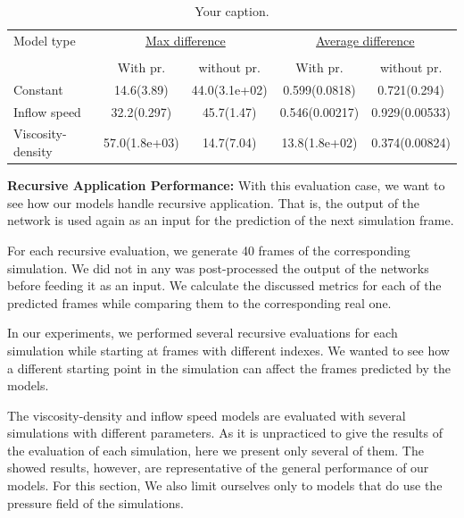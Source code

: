 \documentclass{llncs}
\begin{document}
\begin{table}
  \begin{center}
    \begin{tabular}{lcc|cc}
      \hline
      \hline
      Model type & \multicolumn{2}{c|}{\underline{Max difference}}  &  \multicolumn{2}{c}{\underline{Average difference}}\\
      \multicolumn{3}{c|}{}&&\\
                 & With pr. & without pr.  &  With pr.& without pr.\\
      \hline
      Constant          &  14.6(3.89)&44.0(3.1e+02)&0.599(0.0818)&0.721(0.294)  \\

      Inflow speed      &  32.2(0.297)&45.7(1.47)&0.546(0.00217)&0.929(0.00533) \\

      Viscosity-density &  57.0(1.8e+03)&14.7(7.04)&13.8(1.8e+02)&0.374(0.00824) \\
    \end{tabular}
  \end{center}
  \caption{\label{tab:table-name} Your caption.}
\end{table}

\noindent\textbf{Recursive Application Performance:}
With this evaluation case, we want to see how our models handle recursive application. That is, the output of the network is used again as an input for the prediction of the next simulation frame.

For each recursive evaluation, we generate 40 frames of the corresponding simulation. We did not in any was post-processed the output of the networks before feeding it as an input. We calculate the discussed metrics for each of the predicted frames while comparing them to the corresponding real one.

In our experiments, we performed several recursive evaluations for each simulation while starting at frames with different indexes. We wanted to see how a different starting point in the simulation can affect the frames predicted by the models.

The viscosity-density and inflow speed models are evaluated with several simulations with different parameters. As it is unpracticed to give the results of the evaluation of each simulation, here we present only several of them. The showed results, however, are representative of the general performance of our models. For this section, We also limit ourselves only to models that do use the pressure field of the simulations.
\end{document}
